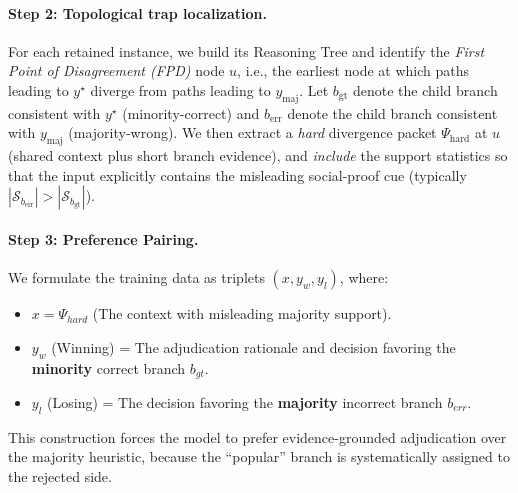 \documentclass{article}
\theoremstyle{plain}
\theoremstyle{definition}
\theoremstyle{remark}
\begin{document}
\paragraph{Step 2: Topological trap localization.}
For each retained instance, we build its Reasoning Tree and identify the \emph{First Point of Disagreement (FPD)} node $u$, i.e., the earliest node at which paths leading to $y^\star$ diverge from paths leading to $y_{\mathrm{maj}}$.
Let $b_{\mathrm{gt}}$ denote the child branch consistent with $y^\star$ (minority-correct) and $b_{\mathrm{err}}$ denote the child branch consistent with $y_{\mathrm{maj}}$ (majority-wrong).
We then extract a \emph{hard} divergence packet $\Psi_{\mathrm{hard}}$ at $u$ (shared context plus short branch evidence), and \emph{include} the support statistics so that the input explicitly contains the misleading social-proof cue (typically $|\mathcal{S}_{b_{\mathrm{err}}}| > |\mathcal{S}_{b_{\mathrm{gt}}}|$).

\paragraph{Step 3: Preference Pairing.}
We formulate the training data as triplets $(x, y_w, y_l)$, where:
\begin{itemize}
    \item $x = \Psi_{hard}$ (The context with misleading majority support).
    \item $y_w$ (Winning) = The adjudication rationale and decision favoring the \textbf{minority} correct branch $b_{gt}$.
    \item $y_l$ (Losing) = The decision favoring the \textbf{majority} incorrect branch $b_{err}$.
\end{itemize}
This construction forces the model to prefer evidence-grounded adjudication over the majority heuristic, because the ``popular'' branch is systematically assigned to the rejected side.
\end{document}
